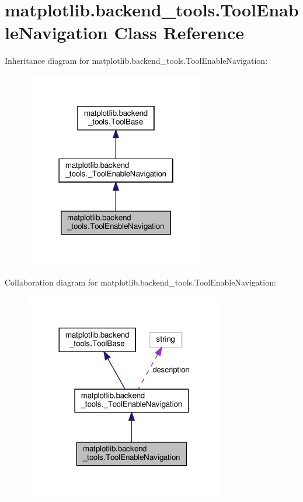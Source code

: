 \hypertarget{classmatplotlib_1_1backend__tools_1_1ToolEnableNavigation}{}\section{matplotlib.\+backend\+\_\+tools.\+Tool\+Enable\+Navigation Class Reference}
\label{classmatplotlib_1_1backend__tools_1_1ToolEnableNavigation}


Inheritance diagram for matplotlib.\+backend\+\_\+tools.\+Tool\+Enable\+Navigation\+:
\nopagebreak
\begin{figure}[H]
\begin{center}
\leavevmode
\includegraphics[width=226pt]{classmatplotlib_1_1backend__tools_1_1ToolEnableNavigation__inherit__graph}
\end{center}
\end{figure}


Collaboration diagram for matplotlib.\+backend\+\_\+tools.\+Tool\+Enable\+Navigation\+:
\nopagebreak
\begin{figure}[H]
\begin{center}
\leavevmode
\includegraphics[width=248pt]{classmatplotlib_1_1backend__tools_1_1ToolEnableNavigation__coll__graph}
\end{center}
\end{figure}

